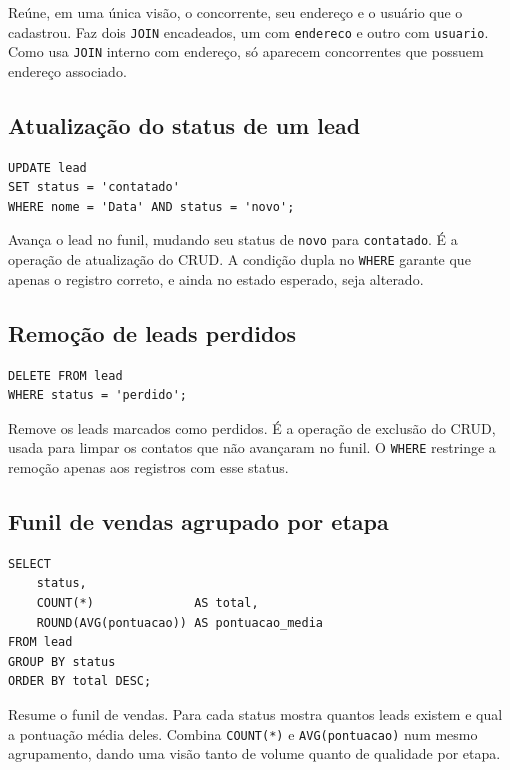 \documentclass[a4paper]{article}
\begin{document}
Reúne, em uma única visão, o concorrente, seu endereço e o usuário que o cadastrou. Faz
dois \texttt{JOIN} encadeados, um com \texttt{endereco} e outro com \texttt{usuario}.
Como usa \texttt{JOIN} interno com endereço, só aparecem concorrentes que possuem endereço
associado.

\subsection{Atualização do status de um lead}

\begin{verbatim}
UPDATE lead
SET status = 'contatado'
WHERE nome = 'Data' AND status = 'novo';
\end{verbatim}

Avança o lead no funil, mudando seu status de \texttt{novo} para \texttt{contatado}. É a
operação de atualização do CRUD. A condição dupla no \texttt{WHERE} garante que apenas o
registro correto, e ainda no estado esperado, seja alterado.

\subsection{Remoção de leads perdidos}

\begin{verbatim}
DELETE FROM lead
WHERE status = 'perdido';
\end{verbatim}

Remove os leads marcados como perdidos. É a operação de exclusão do CRUD, usada para
limpar os contatos que não avançaram no funil. O \texttt{WHERE} restringe a remoção apenas
aos registros com esse status.

\subsection{Funil de vendas agrupado por etapa}

\begin{verbatim}
SELECT
    status,
    COUNT(*)              AS total,
    ROUND(AVG(pontuacao)) AS pontuacao_media
FROM lead
GROUP BY status
ORDER BY total DESC;
\end{verbatim}

Resume o funil de vendas. Para cada status mostra quantos leads existem e qual a pontuação
média deles. Combina \texttt{COUNT(*)} e \texttt{AVG(pontuacao)} num mesmo agrupamento,
dando uma visão tanto de volume quanto de qualidade por etapa.
\end{document}
